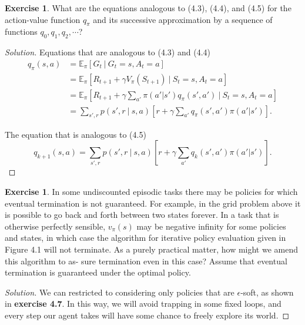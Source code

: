 \documentclass[oneside,11pt]{article}
\theoremstyle{definition}
\newtheorem{exer}[thm]{Exercise}
\newcommand{\EEpi}{\mathbb{E}_{\pi}}
\newcommand{\vpi}{v_{\pi}}
\newcommand{\qpi}{q_{\pi}}
\newcommand\givenbase[1][]{\:#1\lvert\:}
\let\given\givenbase
\newenvironment{solution}
{\renewcommand\qedsymbol{$\blacksquare$}\begin{proof}[Solution]} {\end{proof}}
\begin{document}
\begin{exer}
What are the equations analogous to (4.3), (4.4), and (4.5) for the action-value function $\qpi$ and its successive approximation by a sequence of functions $q_0, q_1, q_2, \cdots$?
\end{exer}


\begin{shaded}
\begin{solution} 

Equations that are analogous to (4.3) and (4.4)
\begin{equation*} %
\begin{split}
\qpi(s,a) & =\EEpi [G_t \given G_t = s, A_t = a] \\
& = \EEpi [R_{t+1} + \gamma V_{\pi}(S_{t+1}) \given S_t = s, A_t = a]\\
& = \EEpi [R_{t+1} + \gamma \sum_{a'} \pi(a'|s')\qpi(s',a') \given S_t = s, A_t = a ]\\
& = \sum\limits_{s', r} p(s',r \given s, a) \left [ r + \gamma \sum_{a'}  q_{\pi}(s', a') \pi(a' | s') \right ].
\end{split}
\end{equation*}

The equation that is analogous to (4.5)
\[ q_{k+1}(s,a) = \sum\limits_{s', r} p(s',r \given s, a) \left [ r + \gamma \sum_{a'}  q_{k}(s', a') \pi(a' | s') \right ]. \]


\end{solution} 
\end{shaded}


\begin{exer}
In some undiscounted episodic tasks there may be policies for which eventual termination is not guaranteed. For example, in the grid problem above it is possible to go back and forth between two states forever. In a task that is otherwise perfectly sensible, $\vpi(s)$ may be negative infinity for some policies and states, in which case the algorithm for iterative policy evaluation given in Figure 4.1 will not terminate. As a purely practical matter, how might we amend this algorithm to as- sure termination even in this case? Assume that eventual termination is guaranteed under the optimal policy.
\end{exer}


\begin{shaded}
\begin{solution} 

We can restricted to considering only policies that are $\epsilon$-soft, as shown in \textbf{exercise 4.7}. In this way, we will avoid trapping in some fixed loops, and every step our agent takes will have some chance to freely explore its world.  


\end{solution} 
\end{shaded}
\end{document}

